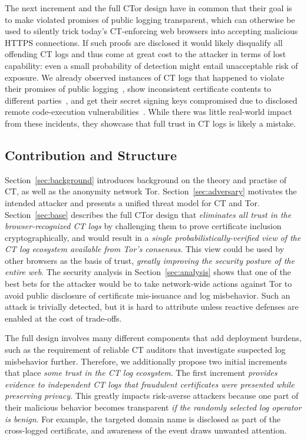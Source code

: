 The next increment and the full CTor design have in common that their goal is
to make violated promises of public logging transparent, which can otherwise be
used to silently trick today's CT-enforcing web browsers into accepting
malicious HTTPS connections.  If such proofs are disclosed it would likely
disqualify all offending CT logs and thus come at great cost to the
attacker in terms of lost capability:
	even a small probability of detection might entail unacceptable risk of
	exposure.
We already observed instances of CT logs that happened to
	violate their promises of public logging~\cite{gdca1-omission},
	show inconsistent certificate contents to different
		parties~\cite{izenpe-disqualified,venafi-disqualified}, and
	get their secret signing keys compromised due to disclosed remote
		code-execution vulnerabilities~\cite{digicert-log-compromised}. 
While there was little real-world impact from these incidents, they
showcase that full trust in CT logs is likely a mistake.

\subsection{Contribution and Structure}
Section~\ref{sec:background} introduces background on the theory and
practise of CT, as well as the anonymity network Tor.
Section~\ref{sec:adversary} motivates the intended attacker and presents a
unified threat model for CT and Tor.
Section~\ref{sec:base} describes the full CTor design that \emph{eliminates
all trust in the browser-recognized CT logs} by challenging them to prove
certificate inclusion cryptographically, and would
result in a \emph{single probabilistically-verified view of the CT log ecosystem
available from Tor's consensus}.  This view could be used by other browsers as
the basis of trust, \emph{greatly improving the security posture of the entire
web}.  The security analysis in Section~\ref{sec:analysis} shows that one of the
best bets for the attacker would be to take network-wide actions against Tor to
avoid public disclosure of certificate mis-issuance and log misbehavior.  Such
an attack is trivially detected, but it is hard to attribute unless reactive
defenses are enabled at the cost of trade-offs.

The full design involves many different components that add deployment burdens,
such as the requirement of reliable CT auditors that investigate suspected log
misbehavior further.  Therefore, we additionally propose two initial increments
that place \emph{some trust in the CT log ecosystem}.  The first increment
\emph{provides evidence to independent CT logs that fraudulent certificates were
presented while preserving privacy}.  This greatly impacts risk-averse attackers
because one part of their malicious behavior becomes transparent \emph{if the
randomly selected log operator is benign}.  For example, the targeted domain
name is disclosed as part of the cross-logged certificate, and awareness of the
event draws unwanted attention.

